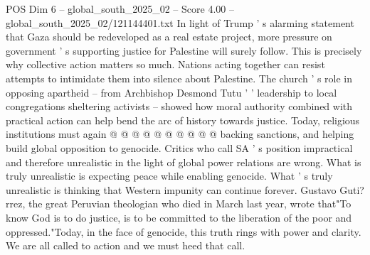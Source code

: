 \begin{textsample}{POS Dim 6 – global\_south\_2025\_02 – Score 4.00 – global\_south\_2025\_02/121144401.txt}
In light of Trump ' s alarming statement that Gaza should be redeveloped as a real estate project, more pressure on government ' s supporting justice for Palestine will surely follow.
This is precisely why collective action matters so much.
Nations acting together can resist attempts to intimidate them into silence about Palestine.
The church ' s role in opposing apartheid -- from Archbishop Desmond Tutu ' ' leadership to local congregations sheltering activists -- showed how moral authority combined with practical action can help bend the arc of history towards justice.
Today, religious institutions must again @ @ @ @ @ @ @ @ @ @ backing sanctions, and helping build global opposition to genocide.
Critics who call SA ' s position impractical and therefore unrealistic in the light of global power relations are wrong.
What is truly unrealistic is expecting peace while enabling genocide.
What ' s truly unrealistic is thinking that Western impunity can continue forever.
Gustavo Guti? rrez, the great Peruvian theologian who died in March last year, wrote that"To know God is to do justice, is to be committed to the liberation of the poor and oppressed."Today, in the face of genocide, this truth rings with power and clarity.
We are all called to action and we must heed that call.

\end{textsample}
